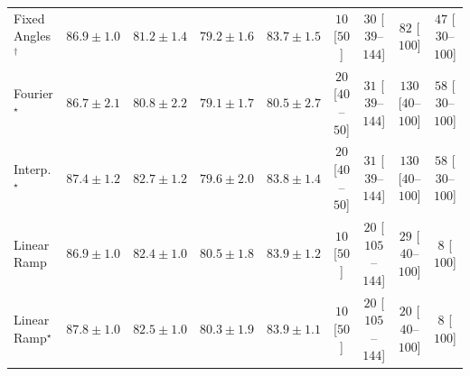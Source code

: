 \begin{tabular}{l|cccc|cccc|}
Fixed Angles$^\dagger$ & {\cellcolor[HTML]{004E2D}} \color[HTML]{F1F1F1} $86.9\pm 1.0$ & {\cellcolor[HTML]{13773D}} \color[HTML]{F1F1F1} $81.2\pm 1.4$ & {\cellcolor[HTML]{228343}} \color[HTML]{F1F1F1} $79.2\pm 1.6$ & {\cellcolor[HTML]{006737}} \color[HTML]{F1F1F1} $83.7\pm 1.5$ & {\cellcolor[HTML]{FFF7F3}} \color[HTML]{000000} $10$ [$50$] & {\cellcolor[HTML]{FFF2EE}} \color[HTML]{000000} $30$ [$39$--$144$] & {\cellcolor[HTML]{FEE6E3}} \color[HTML]{000000} $82$ [$100$] & {\cellcolor[HTML]{FEEEEB}} \color[HTML]{000000} $47$ [$30$--$100$] \\
Fourier$^\star$ & {\cellcolor[HTML]{00502D}} \color[HTML]{F1F1F1} $86.7\pm 2.1$ & {\cellcolor[HTML]{167A3F}} \color[HTML]{F1F1F1} $80.8\pm 2.2$ & {\cellcolor[HTML]{238443}} \color[HTML]{F1F1F1} $79.1\pm 1.7$ & {\cellcolor[HTML]{187B3F}} \color[HTML]{F1F1F1} $80.5\pm 2.7$ & {\cellcolor[HTML]{FFF4F0}} \color[HTML]{000000} $20$ [$40$--$50$] & {\cellcolor[HTML]{FFF2EE}} \color[HTML]{000000} $31$ [$39$--$144$] & {\cellcolor[HTML]{FDDBD7}} \color[HTML]{000000} $130$ [$40$--$100$] & {\cellcolor[HTML]{FEECE9}} \color[HTML]{000000} $58$ [$30$--$100$] \\
Interp.$^\star$ & {\cellcolor[HTML]{004A2B}} \color[HTML]{F1F1F1} $87.4\pm 1.2$ & {\cellcolor[HTML]{076D39}} \color[HTML]{F1F1F1} $82.7\pm 1.2$ & {\cellcolor[HTML]{208242}} \color[HTML]{F1F1F1} $79.6\pm 2.0$ & {\cellcolor[HTML]{006636}} \color[HTML]{F1F1F1} $83.8\pm 1.4$ & {\cellcolor[HTML]{FFF4F0}} \color[HTML]{000000} $20$ [$40$--$50$] & {\cellcolor[HTML]{FFF2EE}} \color[HTML]{000000} $31$ [$39$--$144$] & {\cellcolor[HTML]{FDDBD7}} \color[HTML]{000000} $130$ [$40$--$100$] & {\cellcolor[HTML]{FEECE9}} \color[HTML]{000000} $58$ [$30$--$100$] \\
Linear Ramp & {\cellcolor[HTML]{004E2D}} \color[HTML]{F1F1F1} $86.9\pm 1.0$ & {\cellcolor[HTML]{096F3A}} \color[HTML]{F1F1F1} $82.4\pm 1.0$ & {\cellcolor[HTML]{187B3F}} \color[HTML]{F1F1F1} $80.5\pm 1.8$ & {\cellcolor[HTML]{006636}} \color[HTML]{F1F1F1} $83.9\pm 1.2$ & {\cellcolor[HTML]{FFF7F3}} \color[HTML]{000000} $10$ [$50$] & {\cellcolor[HTML]{FFF4F0}} \color[HTML]{000000} $20$ [$105$--$144$] & {\cellcolor[HTML]{FFF3EF}} \color[HTML]{000000} $29$ [$40$--$100$] & {\cellcolor[HTML]{FFF7F3}} \color[HTML]{000000} $8$ [$100$] \\
Linear Ramp$^\star$ & {\cellcolor[HTML]{00472A}} \color[HTML]{F1F1F1} $87.8\pm 1.0$ & {\cellcolor[HTML]{096F3A}} \color[HTML]{F1F1F1} $82.5\pm 1.0$ & {\cellcolor[HTML]{1A7D40}} \color[HTML]{F1F1F1} $80.3\pm 1.9$ & {\cellcolor[HTML]{006636}} \color[HTML]{F1F1F1} $83.9\pm 1.1$ & {\cellcolor[HTML]{FFF7F3}} \color[HTML]{000000} $10$ [$50$] & {\cellcolor[HTML]{FFF4F0}} \color[HTML]{000000} $20$ [$105$--$144$] & {\cellcolor[HTML]{FFF4F0}} \color[HTML]{000000} $20$ [$40$--$100$] & {\cellcolor[HTML]{FFF7F3}} \color[HTML]{000000} $8$ [$100$] \\

\end{tabular}
